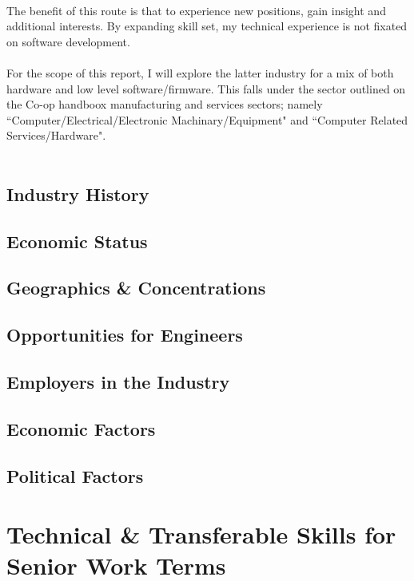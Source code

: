 \documentclass[10pt,letterpaper]{article}
\begin{document}
\\
The benefit of this route is that to experience new positions, gain insight and additional interests. By expanding skill set, my technical experience is not fixated on software development.\\
\\
For the scope of this report, I will explore the latter industry for a mix of both hardware and low level software/firmware. This falls under the sector outlined on the Co-op handboox\cite{coop-handbook} manufacturing and services sectors; namely ``Computer/Electrical/Electronic Machinary/Equipment" and ``Computer Related Services/Hardware".\\
\\
\subsection{Industry History}

\subsection{Economic Status}
\subsection{Geographics \& Concentrations}
\subsection{Opportunities for Engineers}
\subsection{Employers in the Industry}
\subsection{Economic Factors}
\subsection{Political Factors}

\clearpage
\section{Technical \& Transferable Skills for Senior Work Terms}\label{transferable-skills}

\end{document}
